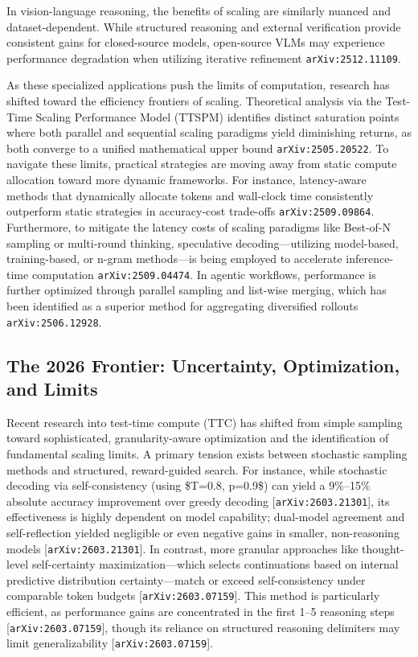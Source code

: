 \documentclass[11pt]{article}
\begin{document}
In vision-language reasoning, the benefits of scaling are similarly nuanced and dataset-dependent. While structured reasoning and external verification provide consistent gains for closed-source models, open-source VLMs may experience performance degradation when utilizing iterative refinement \texttt{arXiv:2512.11109}.

As these specialized applications push the limits of computation, research has shifted toward the efficiency frontiers of scaling. Theoretical analysis via the Test-Time Scaling Performance Model (TTSPM) identifies distinct saturation points where both parallel and sequential scaling paradigms yield diminishing returns, as both converge to a unified mathematical upper bound \texttt{arXiv:2505.20522}. To navigate these limits, practical strategies are moving away from static compute allocation toward more dynamic frameworks. For instance, latency-aware methods that dynamically allocate tokens and wall-clock time consistently outperform static strategies in accuracy-cost trade-offs \texttt{arXiv:2509.09864}. Furthermore, to mitigate the latency costs of scaling paradigms like Best-of-N sampling or multi-round thinking, speculative decoding—utilizing model-based, training-based, or n-gram methods—is being employed to accelerate inference-time computation \texttt{arXiv:2509.04474}. In agentic workflows, performance is further optimized through parallel sampling and list-wise merging, which has been identified as a superior method for aggregating diversified rollouts \texttt{arXiv:2506.12928}.

\subsection{The 2026 Frontier: Uncertainty, Optimization, and Limits}

Recent research into test-time compute (TTC) has shifted from simple sampling toward sophisticated, granularity-aware optimization and the identification of fundamental scaling limits. A primary tension exists between stochastic sampling methods and structured, reward-guided search. For instance, while stochastic decoding via self-consistency (using \$T=0.8, p=0.9\$) can yield a 9\%–15\% absolute accuracy improvement over greedy decoding [\texttt{arXiv:2603.21301}], its effectiveness is highly dependent on model capability; dual-model agreement and self-reflection yielded negligible or even negative gains in smaller, non-reasoning models [\texttt{arXiv:2603.21301}]. In contrast, more granular approaches like thought-level self-certainty maximization—which selects continuations based on internal predictive distribution certainty—match or exceed self-consistency under comparable token budgets [\texttt{arXiv:2603.07159}]. This method is particularly efficient, as performance gains are concentrated in the first 1–5 reasoning steps [\texttt{arXiv:2603.07159}], though its reliance on structured reasoning delimiters may limit generalizability [\texttt{arXiv:2603.07159}].
\end{document}
